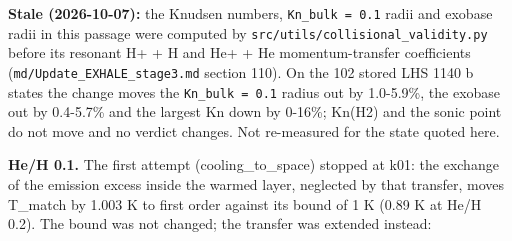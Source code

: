 \documentclass[english,a4paper]{my_memo}
\begin{document}
\textbf{Stale (2026-10-07):} the Knudsen numbers, \texttt{Kn\_bulk\ =\ 0.1} radii and exobase radii in this passage were computed by \texttt{src/utils/collisional\_validity.py} before its resonant H+ + H and He+ + He momentum-transfer coefficients (\texttt{md/Update\_EXHALE\_stage3.md} section 110). On the 102 stored LHS 1140 b states the change moves the \texttt{Kn\_bulk\ =\ 0.1} radius out by 1.0-5.9\%, the exobase out by 0.4-5.7\% and the largest Kn down by 0-16\%; Kn(H2) and the sonic point do not move and no verdict changes. Not re-measured for the state quoted here.

\textbf{He/H 0.1.} The first attempt (cooling\_to\_space) stopped at k01: the
exchange of the emission excess inside the warmed layer, neglected by that
transfer, moves T\_match by 1.003 K to first order against its bound of 1 K
(0.89 K at He/H 0.2). The bound was not changed; the transfer was extended
instead:
\end{document}
